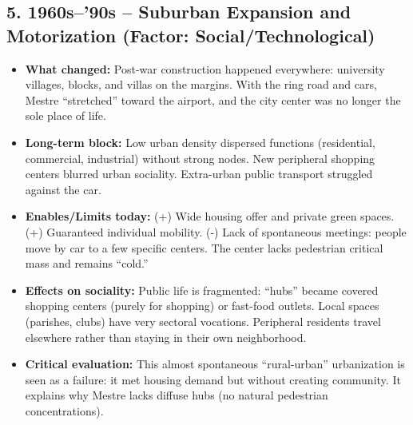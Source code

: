 \documentclass[a4paper,11pt]{article}
\begin{document}
\subsection*{5. 1960s--'90s – Suburban Expansion and Motorization (Factor: Social/Technological)}
\begin{itemize}
    \item \textbf{What changed:} Post-war construction happened everywhere: university villages, blocks, and villas on the margins. With the ring road and cars, Mestre ``stretched'' toward the airport, and the city center was no longer the sole place of life.
    \item \textbf{Long-term block:} Low urban density dispersed functions (residential, commercial, industrial) without strong nodes. New peripheral shopping centers blurred urban sociality. Extra-urban public transport struggled against the car.
    \item \textbf{Enables/Limits today:} (+) Wide housing offer and private green spaces. (+) Guaranteed individual mobility. (-) Lack of spontaneous meetings: people move by car to a few specific centers. The center lacks pedestrian critical mass and remains ``cold.''
    \item \textbf{Effects on sociality:} Public life is fragmented: ``hubs'' became covered shopping centers (purely for shopping) or fast-food outlets. Local spaces (parishes, clubs) have very sectoral vocations. Peripheral residents travel elsewhere rather than staying in their own neighborhood.
    \item \textbf{Critical evaluation:} This almost spontaneous ``rural-urban'' urbanization is seen as a failure: it met housing demand but without creating community. It explains why Mestre lacks diffuse hubs (no natural pedestrian concentrations).
\end{itemize}
\end{document}
